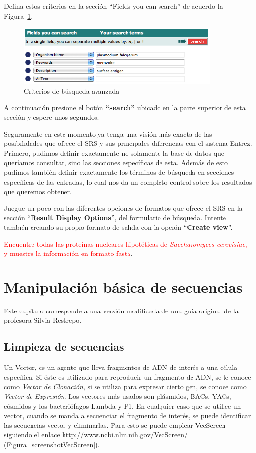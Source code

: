 \documentclass[letter,11pt]{book}
\begin{document}
Defina estos criterios en la sección ``Fields you can search'' de acuerdo la Figura~\ref{busquedaplasmodium}.

\begin{figure}[ht]
\centering
   \includegraphics[width=10cm]{Figs/busquedaSRSplasmodium.png}
  \caption{\label{busquedaplasmodium}Criterios de búsqueda avanzada}
\end{figure}

A continuación presione el botón \textbf{``search''} ubicado en la parte superior de esta sección y espere unos segundos.

Seguramente en este momento ya tenga una visión más exacta de las posibilidades que ofrece el SRS y sus principales diferencias con el sistema Entrez. Primero, pudimos definir exactamente no solamente la base de datos que queríamos consultar, sino las secciones específicas de esta. Además de esto pudimos también definir exactamente los términos de búsqueda en secciones específicas de las entradas, lo cual nos da un completo control sobre los resultados que queremos obtener.

Juegue un poco con las diferentes opciones de formatos que ofrece el SRS en la sección ``\textbf{Result Display Options}'', del formulario de búsqueda. Intente también creando su propio formato de salida con la opción ``\textbf{Create view}''.

\textcolor{red}{Encuentre todas las proteínas nucleares hipotéticas de \textit{Saccharomyces cerevisiae}, y muestre la información en formato fasta}.

\chapter{Manipulación básica de secuencias}

Este capítulo corresponde a una versión modificada de una guía original de la profesora Silvia Restrepo.

\section{Limpieza de secuencias}

Un Vector, es un agente que lleva fragmentos de ADN de interés a una célula específica. Si éste es utilizado para reproducir un fragmento de ADN, se le conoce como \textit{Vector de Clonación}, si se utiliza para expresar cierto gen, se conoce como \textit{Vector de Expresión}. Los vectores más usados son plásmidos, BACs, YACs, cósmidos y los bacteriófagos Lambda y P1. En cualquier caso que se utilice un vector, cuando se manda a secuenciar el fragmento de interés, se puede identificar las secuencias vector y eliminarlas. Para esto se puede emplear VecScreen siguiendo el enlace \url{http://www.ncbi.nlm.nih.gov/VecScreen/} (Figura~\ref{screenshotVecScreen}).
\end{document}
